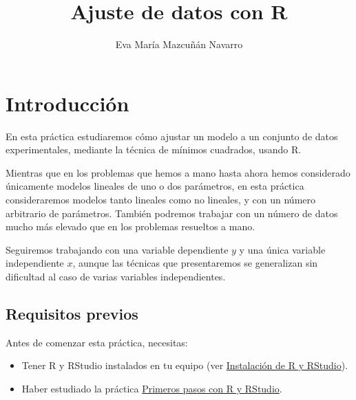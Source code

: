 \documentclass[
  title=normal,
  notoc,
  bib=normal]{mnye}
\title{Ajuste de datos con R}
\author{Eva María Mazcuñán Navarro}
\date{}
\begin{document}
\maketitle

%

{
\hypersetup{linkcolor=etoccolor}
\setcounter{tocdepth}{2}
\tableofcontents
}
\hypertarget{section}{%
\section*{}\label{section}}

\hypertarget{intro}{%
\section*{Introducción}\label{intro}}

En esta práctica estudiaremos cómo ajustar un modelo a un conjunto de datos experimentales, mediante la técnica de mínimos cuadrados, usando \textsf{R}.

Mientras que en los problemas que hemos a mano hasta ahora hemos considerado únicamente modelos lineales de uno o dos parámetros, en esta práctica consideraremos modelos tanto lineales como no lineales, y con un número arbitrario de parámetros. También podremos trabajar con un número de datos mucho más elevado que en los problemas resueltos a mano.

Seguiremos trabajando con una variable dependiente \(y\) y una única variable independiente \(x\), aunque las técnicas que presentaremos se generalizan sin dificultad al caso de varias variables independientes.

\hypertarget{prerequisites}{%
\subsection*{Requisitos previos}\label{prerequisites}}

Antes de comenzar esta práctica, necesitas:

\begin{itemize}
\item
  Tener \textsf{R} y \textsf{RStudio} instalados en tu equipo (ver \href{https://emazcunan.github.io/install-r-rstudio/}{Instalación de R y RStudio}).
\item
  Haber estudiado la práctica \href{https://emazcunan.github.io/basics-r-rstudio/}{Primeros pasos con R y RStudio}.
\end{itemize}
\end{document}
